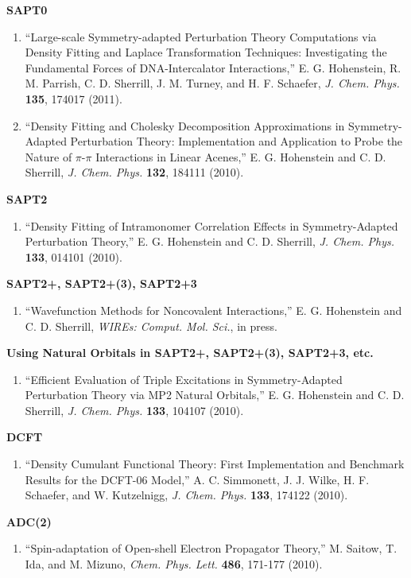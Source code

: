 {\bf SAPT0} 
\begin{enumerate}
\item ``Large-scale Symmetry-adapted Perturbation Theory Computations via
  Density Fitting and Laplace Transformation Techniques: Investigating the
  Fundamental Forces of {DNA}-Intercalator Interactions,'' E. G. Hohenstein,
  R. M. Parrish, C. D. Sherrill, J. M. Turney, and H. F. Schaefer, {\em J.
  Chem. Phys.} {\bf 135}, 174017 (2011).
\item ``Density Fitting and Cholesky Decomposition Approximations
  in Symmetry-Adapted Perturbation Theory: Implementation and Application
  to Probe the Nature of $\pi$-$\pi$ Interactions in Linear Acenes,''
  E. G. Hohenstein and C. D. Sherrill, {\em J. Chem. Phys.} {\bf 132},
  184111 (2010).
\end{enumerate}

{\bf SAPT2} 
\begin{enumerate}
\item ``Density Fitting of Intramonomer Correlation Effects in
  Symmetry-Adapted Perturbation Theory,''
  E. G. Hohenstein and C. D. Sherrill, {\em J. Chem. Phys.} {\bf 133},
  014101 (2010).
\end{enumerate}

{\bf SAPT2+, SAPT2+(3), SAPT2+3} 
\begin{enumerate}
\item ``Wavefunction Methods for Noncovalent Interactions,'' E. G.
  Hohenstein and C. D. Sherrill, {\em WIREs: Comput. Mol. Sci.}, in press.
\end{enumerate}

{\bf Using Natural Orbitals in SAPT2+, SAPT2+(3), SAPT2+3, etc.} 
\begin{enumerate}
\item ``Efficient Evaluation of Triple Excitations in Symmetry-Adapted
  Perturbation Theory via MP2 Natural Orbitals,'' E. G. Hohenstein
  and C. D. Sherrill, {\em J. Chem. Phys.} {\bf 133}, 104107 (2010).
\end{enumerate}

{\bf DCFT} 
\begin{enumerate}
\item ``Density Cumulant Functional Theory: First Implementation and
  Benchmark Results for the {DCFT-06} Model,'' A. C. Simmonett,
  J. J. Wilke, H. F. Schaefer, and W. Kutzelnigg, {\em J. Chem. Phys.}
  {\bf 133}, 174122 (2010).
\end{enumerate}

{\bf ADC(2)} 
\begin{enumerate}
\item ``Spin-adaptation of Open-shell Electron Propagator Theory,''
  M. Saitow, T. Ida, and M. Mizuno, {\em Chem. Phys. Lett.} {\bf 486},
  171-177 (2010).
\end{enumerate}

